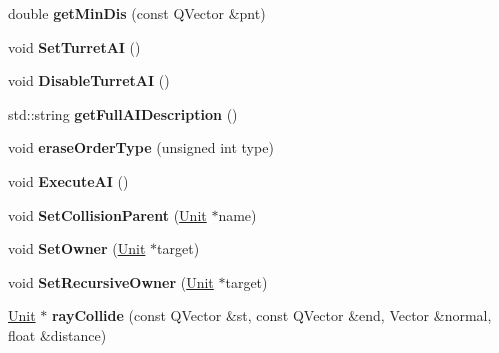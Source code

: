 \begin{DoxyCompactItemize}
\item 
double {\bfseries get\+Min\+Dis} (const Q\+Vector \&pnt)\hypertarget{classUnit_a2b7aaba17ce4347f1cb9e713a1eadaeb}{}\label{classUnit_a2b7aaba17ce4347f1cb9e713a1eadaeb}

\item 
void {\bfseries Set\+Turret\+AI} ()\hypertarget{classUnit_a7648ce8fcd0f0af15127ef97171a62df}{}\label{classUnit_a7648ce8fcd0f0af15127ef97171a62df}

\item 
void {\bfseries Disable\+Turret\+AI} ()\hypertarget{classUnit_a40cad9562c932e002f1b133680fec49d}{}\label{classUnit_a40cad9562c932e002f1b133680fec49d}

\item 
std\+::string {\bfseries get\+Full\+A\+I\+Description} ()\hypertarget{classUnit_a3ac4d129eb967b5913d1b2f0ba31201c}{}\label{classUnit_a3ac4d129eb967b5913d1b2f0ba31201c}

\item 
void {\bfseries erase\+Order\+Type} (unsigned int type)\hypertarget{classUnit_acf0818d22d64c1d09d8e603e6e55e6bf}{}\label{classUnit_acf0818d22d64c1d09d8e603e6e55e6bf}

\item 
void {\bfseries Execute\+AI} ()\hypertarget{classUnit_a2d294aa5ba38aad1f7c0d23d253d019c}{}\label{classUnit_a2d294aa5ba38aad1f7c0d23d253d019c}

\item 
void {\bfseries Set\+Collision\+Parent} (\hyperlink{classUnit}{Unit} $\ast$name)\hypertarget{classUnit_ae9b1c96a5ea24b0d0b37837e185224bc}{}\label{classUnit_ae9b1c96a5ea24b0d0b37837e185224bc}

\item 
void {\bfseries Set\+Owner} (\hyperlink{classUnit}{Unit} $\ast$target)\hypertarget{classUnit_a32cd99fb5363e9064b4f73757edd8c0a}{}\label{classUnit_a32cd99fb5363e9064b4f73757edd8c0a}

\item 
void {\bfseries Set\+Recursive\+Owner} (\hyperlink{classUnit}{Unit} $\ast$target)\hypertarget{classUnit_a1ed3a6bb69ffd1c67bfabdb385d0cea5}{}\label{classUnit_a1ed3a6bb69ffd1c67bfabdb385d0cea5}

\item 
\hyperlink{classUnit}{Unit} $\ast$ {\bfseries ray\+Collide} (const Q\+Vector \&st, const Q\+Vector \&end, Vector \&normal, float \&distance)\hypertarget{classUnit_acf1996e1d8a20c69884fb2a5894acecb}{}\label{classUnit_acf1996e1d8a20c69884fb2a5894acecb}


\end{DoxyCompactItemize}
